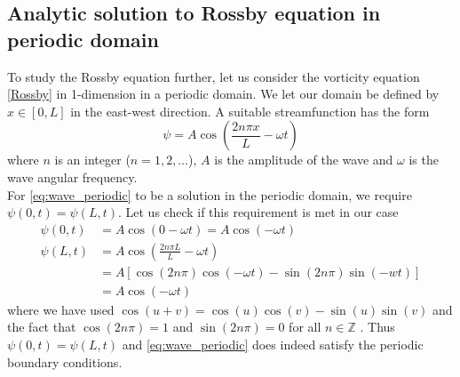 \documentclass[12pt]{article}
\numberwithin{figure}{section}
\numberwithin{table}{section}
\begin{document}
\subsection{Analytic solution to Rossby equation in periodic domain} \label{sec:analytical_periodic}
\noindent To study the Rossby equation further, let us consider the vorticity equation \eqref{Rossby} in 1-dimension in a periodic domain. We let our domain be defined by $x\in [0, L]$ in the east-west direction. A suitable streamfunction has the form \cite{pro5}  
\begin{equation}
\label{eq:wave_periodic}
\psi = A\cos\left(\frac{2n\pi x}{L}-\omega t\right)
\end{equation}
where $n$ is an integer ($n=1,2,\dots$), $A$ is the amplitude of the wave and $\omega$ is the wave angular frequency.\\ 
\noindent For \eqref{eq:wave_periodic} to be a solution in the periodic domain, we require $\psi(0,t)=\psi(L,t)$. Let us check if this requirement is met in our case
\begin{align*}
\psi(0,t)&= A\cos\left(0-\omega t\right) = A\cos\left(-\omega t\right)\\
\psi(L,t) &= A\cos\left(\frac{2n\pi L}{L}-\omega t\right)\\
&= A\left[\cos(2n\pi)\cos(-\omega t)-\sin(2n\pi)\sin(-wt) \right]\\
&=A\cos(-\omega t)
\end{align*}
where we have used $\cos(u+v)=\cos(u)\cos(v)-\sin(u)\sin(v)$ and the fact that $\cos(2n\pi)=1$ and $\sin(2n\pi)=0$ for all $n\in\mathbb{Z}$ \cite{MathMethods}. Thus $\psi(0,t)=\psi(L,t)$ and \ref{eq:wave_periodic} does indeed satisfy the periodic boundary conditions.\\
\end{document}
